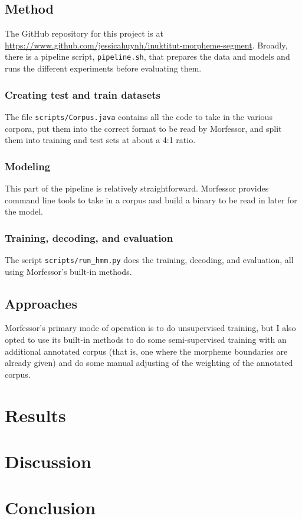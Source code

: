 \documentclass[10pt]{article}
\begin{document}
\subsection{Method}
The GitHub repository for this project is at \url{https://www.github.com/jessicahuynh/inuktitut-morpheme-segment}. Broadly, there is a pipeline script, \texttt{pipeline.sh}, that prepares the data and models and runs the different experiments before evaluating them.

\subsubsection{Creating test and train datasets}
The file \texttt{scripts/Corpus.java} contains all the code to take in the various corpora, put them into the correct format to be read by Morfessor, and split them into training and test sets at about a 4:1 ratio.

\subsubsection{Modeling}
This part of the pipeline is relatively straightforward. Morfessor provides command line tools to take in a corpus and build a binary to be read in later for the model.

\subsubsection{Training, decoding, and evaluation}
The script \texttt{scripts/run\_hmm.py} does the training, decoding, and evaluation, all using Morfessor's built-in methods.

\subsection{Approaches}
Morfessor's primary mode of operation is to do unsupervised training, but I also opted to use its built-in methods to do some semi-supervised training with an additional annotated corpus (that is, one where the morpheme boundaries are already given) and do some manual adjusting of the weighting of the annotated corpus.

\section{Results}

\section{Discussion}

\section{Conclusion}

\pagebreak


\end{document}
